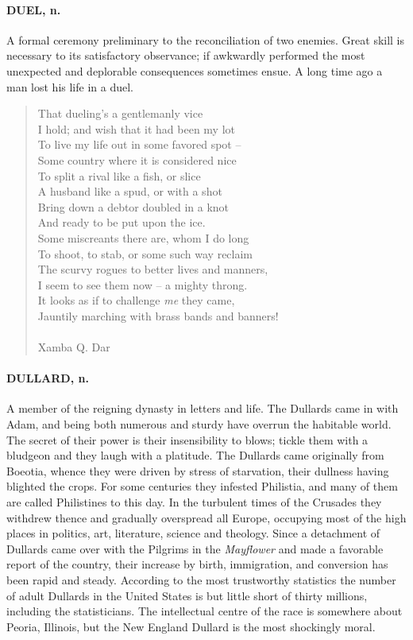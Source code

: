 \documentclass[11pt]{article}
\begin{document}
\paragraph{DUEL, n.}  A formal ceremony preliminary to the reconciliation of two
enemies.  Great skill is necessary to its satisfactory observance; if
awkwardly performed the most unexpected and deplorable consequences
sometimes ensue.  A long time ago a man lost his life in a duel.

\begin{quote}   That dueling's a gentlemanly vice \\
      I hold; and wish that it had been my lot \\
      To live my life out in some favored spot -- \\
  Some country where it is considered nice \\
  To split a rival like a fish, or slice \\
      A husband like a spud, or with a shot \\
      Bring down a debtor doubled in a knot \\
  And ready to be put upon the ice. \\
  Some miscreants there are, whom I do long \\
      To shoot, to stab, or some such way reclaim \\
  The scurvy rogues to better lives and manners, \\
  I seem to see them now -- a mighty throng. \\
      It looks as if to challenge {\em me} they came, \\
  Jauntily marching with brass bands and banners! \\
 \\
Xamba Q. Dar \end{quote}


\paragraph{DULLARD, n.}  A member of the reigning dynasty in letters and life.
The Dullards came in with Adam, and being both numerous and sturdy
have overrun the habitable world.  The secret of their power is their
insensibility to blows; tickle them with a bludgeon and they laugh
with a platitude.  The Dullards came originally from Boeotia, whence
they were driven by stress of starvation, their dullness having
blighted the crops.  For some centuries they infested Philistia, and
many of them are called Philistines to this day.  In the turbulent
times of the Crusades they withdrew thence and gradually overspread
all Europe, occupying most of the high places in politics, art,
literature, science and theology.  Since a detachment of Dullards came
over with the Pilgrims in the {\em Mayflower} and made a favorable report
of the country, their increase by birth, immigration, and conversion
has been rapid and steady.  According to the most trustworthy
statistics the number of adult Dullards in the United States is but
little short of thirty millions, including the statisticians.  The
intellectual centre of the race is somewhere about Peoria, Illinois,
but the New England Dullard is the most shockingly moral.
\end{document}
